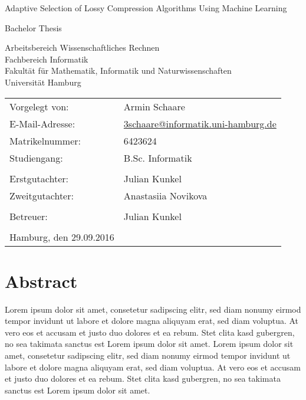 \documentclass[
	12pt,
	a4paper,
	BCOR10mm,
	DIV14,
	headsepline,
]{scrreprt}
\begin{document}
\begin{titlepage}
	\begin{center}
		{\titlefont\huge Adaptive Selection of Lossy Compression Algorithms Using Machine Learning\par}

		\bigskip
		\bigskip

		{\Large Bachelor Thesis\par}

		\bigskip
		\bigskip

		{\large Arbeitsbereich Wissenschaftliches Rechnen\\
		Fachbereich Informatik\\
		Fakultät für Mathematik, Informatik und Naturwissenschaften\\
		Universität Hamburg\par}
	\end{center}

	\vfill

	{\large\begin{tabular}{ll}
		Vorgelegt von:  & Armin Schaare \\
		E-Mail-Adresse: & \href{mailto:3schaare@informatik.uni-hamburg.de}{3schaare@informatik.uni-hamburg.de} \\
		Matrikelnummer: & 6423624 \\
		Studiengang:    & B.Sc. Informatik \\
		\\
		Erstgutachter:  & Julian Kunkel \\
		Zweitgutachter: & Anastasiia Novikova \\ \\
		Betreuer:       & Julian Kunkel \\
		\\
		Hamburg, den 29.09.2016
	\end{tabular}\par}
\end{titlepage}

\chapter*{Abstract}

\thispagestyle{empty}

Lorem ipsum dolor sit amet, consetetur sadipscing elitr, sed diam nonumy eirmod tempor invidunt ut labore et dolore magna aliquyam erat, sed diam voluptua.
At vero eos et accusam et justo duo dolores et ea rebum.
Stet clita kasd gubergren, no sea takimata sanctus est Lorem ipsum dolor sit amet.
Lorem ipsum dolor sit amet, consetetur sadipscing elitr, sed diam nonumy eirmod tempor invidunt ut labore et dolore magna aliquyam erat, sed diam voluptua.
At vero eos et accusam et justo duo dolores et ea rebum.
Stet clita kasd gubergren, no sea takimata sanctus est Lorem ipsum dolor sit amet.
\end{document}
